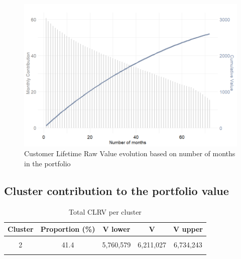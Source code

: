 \documentclass[
]{book}
\begin{document}
\begin{figure}

{\centering \includegraphics[width=12.5in]{./imgs/clrv_evolution} 

}

\caption{Customer Lifetime Raw Value evolution based on number of months in the portfolio}\label{fig:clrvEvolution}
\end{figure}

\hypertarget{cluster-contribution-to-the-portfolio-value}{%
\subsection{Cluster contribution to the portfolio value}\label{cluster-contribution-to-the-portfolio-value}}

\begin{table}[H]

\caption{\label{tab:totValclust}Total CLRV per cluster}
\centering
\begin{tabular}[t]{ccccc}
\toprule
Cluster & Proportion (\%) & V lower & V & V upper\\
\midrule
\cellcolor{gray!6}{1} & \cellcolor{gray!6}{26.6} & \cellcolor{gray!6}{2,035,928} & \cellcolor{gray!6}{2,117,932} & \cellcolor{gray!6}{2,213,746}\\
2 & 41.4 & 5,760,579 & 6,211,027 & 6,734,243\\
\cellcolor{gray!6}{3} & \cellcolor{gray!6}{32.1} & \cellcolor{gray!6}{9,807,637} & \cellcolor{gray!6}{9,941,041} & \cellcolor{gray!6}{10,083,660}\\
\bottomrule
\end{tabular}
\end{table}
\end{document}
